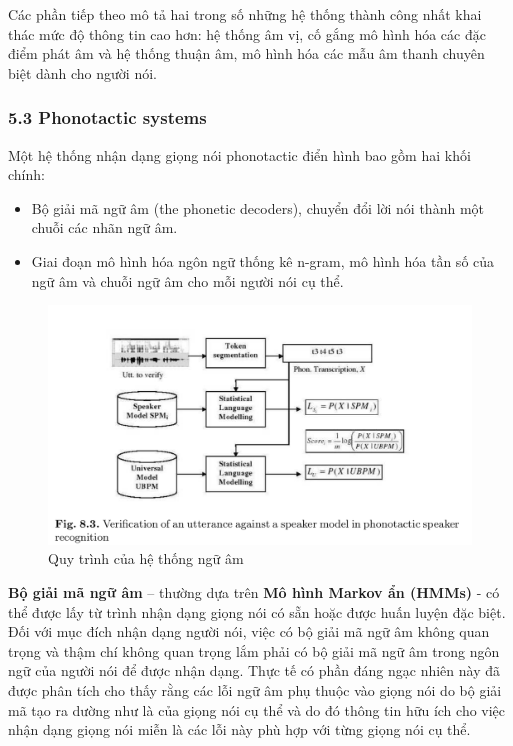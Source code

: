 \documentclass{article}
\begin{document}
	Các phần tiếp theo mô tả hai trong số những hệ thống thành công nhất khai thác mức độ thông tin cao hơn: hệ thống âm vị, cố gắng mô hình hóa các đặc điểm phát âm và hệ thống thuận âm, mô hình hóa các mẫu âm thanh chuyên biệt dành cho người nói.
	
	\subsubsection{5.3 Phonotactic systems}
	\qquad Một hệ thống nhận dạng giọng nói phonotactic điển hình bao gồm hai khối chính:
	\begin{itemize}
		\item Bộ giải mã ngữ âm (the phonetic decoders), chuyển đổi lời nói thành một chuỗi các nhãn ngữ âm.
		\item Giai đoạn mô hình hóa ngôn ngữ thống kê n-gram, mô hình hóa tần số của ngữ âm và chuỗi ngữ âm cho mỗi người nói cụ thể.
	\end{itemize}

	\begin{figure}[H]
		\centering
		\includegraphics[width=1\linewidth]{images/figure_8_3.png}
		\caption{Quy trình của hệ thống ngữ âm}
		\label{fig:writing-thesis}
	\end{figure}
	
	\textbf{Bộ giải mã ngữ âm} – thường dựa trên \textbf{Mô hình Markov ẩn (HMMs)} - có thể được lấy từ trình nhận dạng giọng nói có sẵn hoặc được huấn luyện đặc biệt. Đối với mục đích nhận dạng người nói, việc có bộ giải mã ngữ âm không quan trọng và thậm chí không quan trọng lắm phải có bộ giải mã ngữ âm trong ngôn ngữ của người nói để được nhận dạng. Thực tế có phần đáng ngạc nhiên này đã được phân tích cho thấy rằng các lỗi ngữ âm phụ thuộc vào giọng nói do bộ giải mã tạo ra dường như là của giọng nói cụ thể và do đó thông tin hữu ích cho việc nhận dạng giọng nói miễn là các lỗi này phù hợp với từng giọng nói cụ thể.
	
\end{document}
